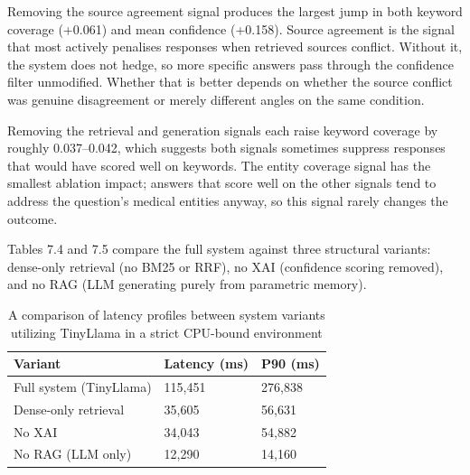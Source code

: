 Removing the source agreement signal produces the largest jump in both keyword coverage (+0.061) and mean confidence (+0.158). Source agreement is the signal that most actively penalises responses when retrieved sources conflict. Without it, the system does not hedge, so more specific answers pass through the confidence filter unmodified. Whether that is better depends on whether the source conflict was genuine disagreement or merely different angles on the same condition.

Removing the retrieval and generation signals each raise keyword coverage by roughly 0.037--0.042, which suggests both signals sometimes suppress responses that would have scored well on keywords. The entity coverage signal has the smallest ablation impact; answers that score well on the other signals tend to address the question's medical entities anyway, so this signal rarely changes the outcome.

Tables 7.4 and 7.5 compare the full system against three structural variants: dense-only retrieval (no BM25 or RRF), no XAI (confidence scoring removed), and no RAG (LLM generating purely from parametric memory).

\begin{table}[htbp]
\centering
\caption{System variant quality comparison (n=97, TinyLlama, 95\% bootstrap CIs in brackets)}
\label{tab:baseline_quality}
\renewcommand{\arraystretch}{1.3}
\end{table}

\begin{table}[htbp]
\centering
\caption{A comparison of latency profiles between system variants utilizing TinyLlama in a strict CPU-bound environment}
\label{tab:baseline_latency}
\renewcommand{\arraystretch}{1.3}
\begin{tabular}{|l|l|l|}
\hline
\textbf{Variant} & \textbf{Latency (ms)} & \textbf{P90 (ms)} \\
\hline
Full system (TinyLlama) & 115,451 & 276,838 \\
Dense-only retrieval    & 35,605  & 56,631  \\
No XAI                  & 34,043  & 54,882  \\
No RAG (LLM only)       & 12,290  & 14,160  \\
\hline
\end{tabular}
\end{table}

